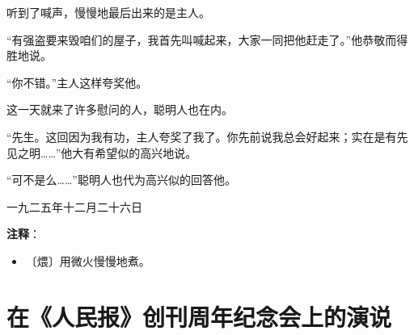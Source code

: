 \documentclass[12pt,UTF-8,openany]{ctexbook}
\begin{document}
\begin{normalsize}
    听到了喊声，慢慢地最后出来的是主人。
    
    “有强盗要来毁咱们的屋子，我首先叫喊起来，大家一同把他赶走了。”他恭敬而得胜地说。
    
    “你不错。”主人这样夸奖他。
    
    这一天就来了许多慰问的人，聪明人也在内。
    
    “先生。这回因为我有功，主人夸奖了我了。你先前说我总会好起来；实在是有先见之明……”他大有希望似的高兴地说。
    
    “可不是么……”聪明人也代为高兴似的回答他。
    
    \hfill 一九二五年十二月二十六日
    
\end{normalsize}


\newpage

\textbf{注释}：

\vspace{-1em}

\begin{itemize}
    \setlength\itemsep{-0.2em}
    \item 〔煨〕用微火慢慢地煮。
\end{itemize}

\chapter{在《人民报》创刊周年纪念会上的演说}
\end{document}
